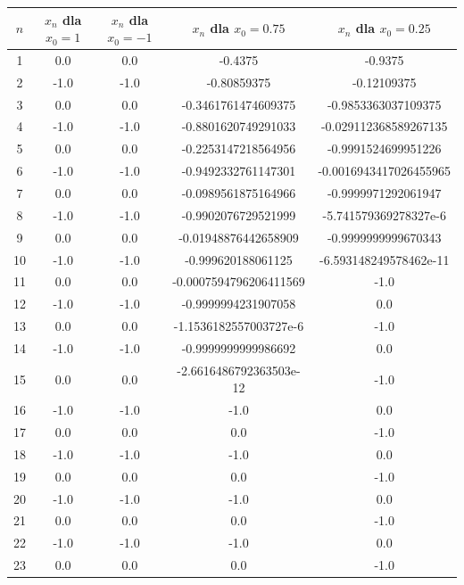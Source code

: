 \documentclass{article}
\begin{document}
\begin{table}[h!]
    \centering
    \begin{tabular}{ |c|c|c|c|c| }
    \hline
    $n$ & $x_n$ dla $x_0 = 1$ & $x_n$ dla $x_0 = -1$ & $x_n$ dla $x_0 = 0.75$ & $x_n$ dla $x_0 = 0.25$ \\
    \hline
    1 & 0.0 & 0.0 & -0.4375 & -0.9375 \\
    \hline
    2 & -1.0 & -1.0 & -0.80859375 & -0.12109375 \\
    \hline
    3 & 0.0 & 0.0 & -0.3461761474609375 & -0.9853363037109375 \\
    \hline
    4 & -1.0 & -1.0 & -0.8801620749291033 & -0.029112368589267135 \\
    \hline
    5 & 0.0 & 0.0 & -0.2253147218564956 & -0.9991524699951226 \\
    \hline
    6 & -1.0 & -1.0 & -0.9492332761147301 & -0.0016943417026455965 \\
    \hline
    7 & 0.0 & 0.0 & -0.0989561875164966 & -0.9999971292061947 \\
    \hline
    8 & -1.0 & -1.0 & -0.9902076729521999 & -5.741579369278327e-6 \\
    \hline
    9 & 0.0 & 0.0 & -0.01948876442658909 & -0.9999999999670343 \\
    \hline
    10 & -1.0 & -1.0 & -0.999620188061125 & -6.593148249578462e-11 \\
    \hline
    11 & 0.0 & 0.0 & -0.0007594796206411569 & -1.0 \\
    \hline
    12 & -1.0 & -1.0 & -0.9999994231907058 & 0.0 \\
    \hline
    13 & 0.0 & 0.0 & -1.1536182557003727e-6 & -1.0 \\
    \hline
    14 & -1.0 & -1.0 & -0.9999999999986692 & 0.0 \\
    \hline
    15 & 0.0 & 0.0 & -2.6616486792363503e-12 & -1.0 \\
    \hline
    16 & -1.0 & -1.0 & -1.0 & 0.0 \\
    \hline
    17 & 0.0 & 0.0 & 0.0 & -1.0 \\
    \hline
    18 & -1.0 & -1.0 & -1.0 & 0.0 \\
    \hline
    19 & 0.0 & 0.0 & 0.0 & -1.0 \\
    \hline
    20 & -1.0 & -1.0 & -1.0 & 0.0 \\
    \hline
    21 & 0.0 & 0.0 & 0.0 & -1.0 \\
    \hline
    22 & -1.0 & -1.0 & -1.0 & 0.0 \\
    \hline
    23 & 0.0 & 0.0 & 0.0 & -1.0 \\

\end{tabular}
\end{table}
\end{document}
